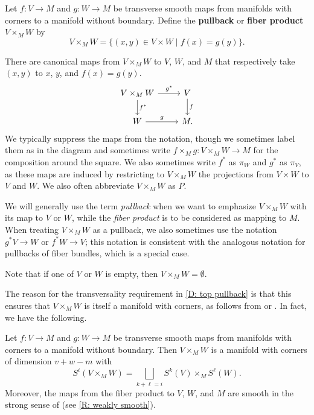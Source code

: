 \begin{definition}\label{D: top pullback}
	Let $f \colon V \to M$ and $g \colon W \to M$ be transverse smooth maps from manifolds with corners to a manifold without boundary.
	Define the \textbf{pullback} or \textbf{fiber product} $V \times_M W$ by
	$$V \times_M W = \{(x, y) \in V \times W \mid f(x) = g(y)\}.$$

	There are canonical maps from $V \times_M W$ to $V$, $W$, and $M$ that respectively take $(x,y)$ to $x$, $y$, and $f(x) = g(y)$.
	\[
	\begin{tikzcd}
		V \times_M W \arrow[r, "g^*"] \arrow[d, "f^*"] & V \arrow[d, "f"] \\
		W \arrow[r, "g"] & M.
	\end{tikzcd}
	\]
	We typically suppress the maps from the notation, though we sometimes label them as in the diagram and sometimes write $f \times_M g \colon V \times_M W \to M$ for the composition around the square.
	We also sometimes write $f^*$ as $\pi_W$ and $g^*$ as $\pi_V$, as these maps are induced by restricting to $V \times_MW$ the projections from $V \times W$ to $V$ and $W$.
	We also often abbreviate $V \times_M W$ as $P$.

	We will generally use the term \textit{pullback} when we want to emphasize $V \times_M W$ with its map to $V$ or $W$, while the \textit{fiber product} is to be considered as mapping to $M$.
	When treating $V \times_M W$ as a pullback, we also sometimes use the notation $g^*V \to W$ or $f^*W \to V$; this notation is consistent with the analogous notation for pullbacks of fiber bundles, which is a special case.

	Note that if one of $V$ or $W$ is empty, then $V \times_M W = \emptyset$.
\end{definition}

The reason for the transversality requirement in \cref{D: top pullback} is that this ensures that $V \times_M W$ is itself a manifold with corners, as follows from \cite[Theorem 7.2.7]{MaDo92} or \cite[Theorem 6.4]{Joy12}. In fact, we have the following.

\begin{theorem}\label{pullback}
	Let $f \colon V \to M$ and $g \colon W \to M$ be transverse smooth maps from manifolds with corners to a manifold without boundary.
	Then $V \times_M W$ is a manifold with corners of dimension $v+w-m$ with
	\begin{equation*}
		S^i(V \times_M W) = \bigsqcup_{k + \ell = i} S^k(V) \times_M S^\ell(W).
	\end{equation*}
	Moreover, the maps from the fiber product to $V$, $W$, and $M$ are smooth in the strong sense of \cite[Definition 3.1]{Joy12} (see \cref{R: weakly smooth}).
\end{theorem}


